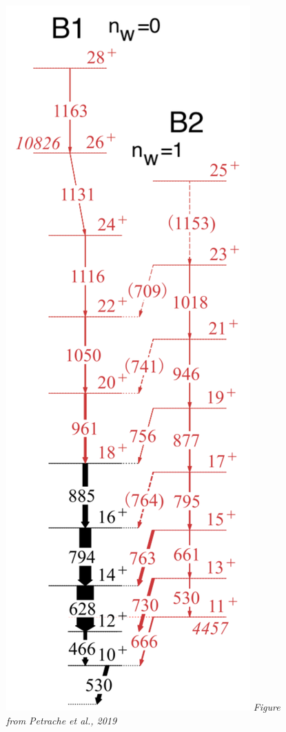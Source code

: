 \documentclass{beamer}
\begin{document}
\begin{frame}
\begin{columns}
\begin{column}{0.2\textwidth}
\begin{figure}
      \includegraphics[scale=0.13]{Figs/ba-130-level-scheme.pdf}
      \tiny{\textit{Figure from Petrache et al., 2019}}
    \end{figure}
  \end{column}
  \end{columns}

\end{frame}
\end{document}
